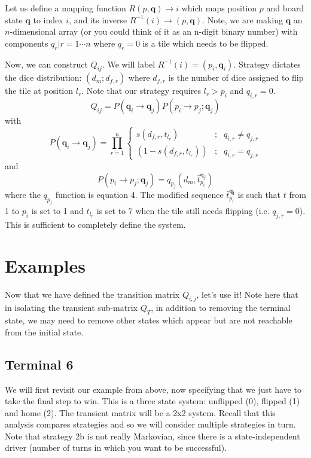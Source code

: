 \documentclass[letterpaper]{article}
\begin{document}
Let us define a mapping function
$R(p,\mathbf{q})\rightarrow i$ which maps position $p$ and board state 
$\mathbf{q}$ to index $i$, and its inverse 
$R^{-1}(i)\rightarrow(p,\mathbf{q})$.  Note, we are
making $\mathbf{q}$ an $n$-dimensional array (or you could think of it as an
n-digit binary number) with components $q_r|r=1\cdots n$ where $q_r=0$ is a
tile which needs to be flipped.  

Now, we can
construct $Q_{ij}$.  We will label $R^{-1}(i) = (p_i, \mathbf{q}_i)$.  Strategy
dictates the dice distribution: $(d_m;d_{f,r})$ where $d_{f,r}$ is the number
of dice assigned to flip the tile at position $l_r$.  Note that our strategy
requires $l_r>p_i$ and $q_{i,r}=0$.
\[
	Q_{ij} = P(\mathbf{q}_i\rightarrow\mathbf{q}_j)P(p_i \rightarrow p_j;\mathbf{q}_j)
\]
with
\[
	P(\mathbf{q}_i\rightarrow\mathbf{q}_j)=\prod_{r=1}^{n} 
	\left\{
		\begin{array}{lrl}
			s(d_{f,r},t_{l_r}) & ; & q_{i,r} \neq q_{j,r} \\
			\left(1-s(d_{f,r},t_{l_r})\right) &;& q_{i,r} = q_{j,r}
		\end{array}
	\right. 
\]
and
\[
	P(p_i \rightarrow p_j;\mathbf{q}_j)=q_{p_j}(d_m,\bar{t}_{p_i}^{\mathbf{q}_j})
\]
where the $q_{p_j}$ function is equation 4.  The modified sequence 
$\bar{t}_{p_i}^\mathbf{q_j}$ is such that $t$ from 1 to $p_i$ is set to 1 and
$t_{l_r}$ is set to 7 when the tile still needs flipping (i.e. $q_{j,r}=0$).
This is sufficient to completely define the system.

\section{Examples}
Now that we have defined the transition matrix $Q_{i,j}$, let's use it!  Note
here that in isolating the transient sub-matrix $Q_T$, in addition to removing
the terminal state, we may need to remove other states which appear but are
not reachable from the initial state.  

\subsection{Terminal 6}
We will first revisit our example from above, now specifying that we just
have to take the final step to win.  This is a three state system: unflipped
(0), flipped (1) and home (2).  The transient matrix will be a 2x2 system.
Recall that this analysis compares strategies and so we will consider multiple
strategies in turn.  Note that strategy 2b is not really Markovian, since
there is a state-independent driver (number of turns in which you want to be
successful). 
\end{document}
